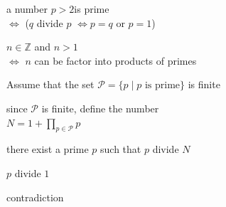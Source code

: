 \label{prime number definition}

a number $p > 2$​ is prime \\$\iff$ ($q$ divide $p$
$\iff p = q$ or $p = 1$)​
\label{fundalmental theorem of arithmetic}

$n \in \mathbb{Z}$ and $n > 1$\\$\iff$ $n$ can be factor into products of primes​​
\label{Asume the contradiction}

​Assume that the set $\mathcal P = \{p \mid p \text{ is prime} \}$ is finite
\label{N definition}

​since $\mathcal P$ is finite, define the number \\$N = 1 + \prod_{p \in \mathcal P}p$​
\label{#6}

there exist a prime $p$ such​ that $p$ divide $N$
\label{#9}

$p$ divide $1$​
\label{#10}

contradiction​
